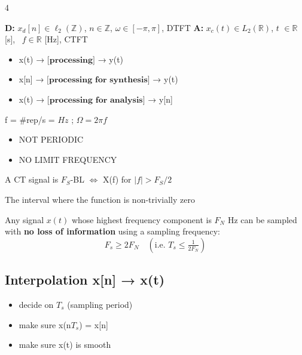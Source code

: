 \documentclass[8pt,a4paper,landscape]{extarticle}
\begin{document}
\begin{multicols*}{4}
\begin{defn}[title=CT vs.\ DT paradigm]
\textbf{D:} $x_d[n]\in\ell_2(\mathbb{Z})$, $n\in\mathbb{Z}$, $\omega\in[-\pi,\pi]$, DTFT \newline
\textbf{A:} $x_c(t)\in L_2(\mathbb{R})$, $t$ $\in\mathbb{R}$ [s], \ $f\in\mathbb{R}$ [Hz], CTFT
\end{defn}

\begin{prop}[title=Use cases]
\begin{itemize}
  \item x(t) → $\textbf{[processing]}$ → y(t)
  \item x[n] → $\textbf{[processing for synthesis]}$ → y(t)
  \item x(t) → $\textbf{[processing for analysis]}$ → y[n]
\end{itemize}
\end{prop}

\begin{prop}[title=Real-world frequency]
f = $\#$rep/s = $Hz$ ; $\Omega = 2\pi f$
\end{prop}

\begin{thm}[title=CTFT (more info in cs)]
\begin{itemize}
  \item NOT PERIODIC
  \item NO LIMIT FREQUENCY
\end{itemize}
\end{thm}

\begin{defn}[title=BandLimited (BL) functions]
A CT signal is $F_S$-BL $\Leftrightarrow$ X(f) for $|f|>F_S/2$
\end{defn}

\begin{defn}[title=Support of a function]
The interval where the function is non-trivially zero
\end{defn}

\begin{thm}[title=Sampling theorem (Shannon--Nyquist)]
Any signal $x(t)$ whose highest frequency component is $F_N$ Hz can be sampled with \textbf{no loss of information} using a sampling frequency:
\[F_s \ge 2F_N \quad \left(\text{i.e.\ } T_s \le \tfrac{1}{2F_N}\right)\]
\end{thm}

\subsection{Interpolation x[n] → x(t)}
\begin{prop}[title=Interpolation requirement]
\begin{itemize}
  \item decide on $T_s$ (sampling period)
  \item make sure x(n$T_s$) = x[n]
  \item make sure x(t) is smooth
\end{itemize}
\end{prop}


\end{multicols*}
\end{document}
